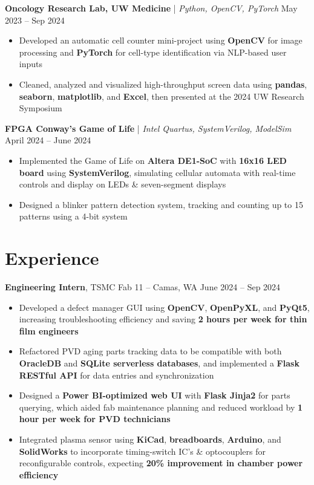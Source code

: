 \documentclass[11pt]{article}       %
\begin{document}
\textbf{Oncology Research Lab, UW Medicine} | \textit{Python, OpenCV, PyTorch} \hfill May 2023 -- Sep 2024 \\
\vspace{-9pt}
\begin{itemize}
  \item Developed an automatic cell counter mini-project using \textbf{OpenCV} for image processing and \textbf{PyTorch} for cell-type identification via NLP-based user inputs
  \item Cleaned, analyzed and visualized high-throughput screen data using \textbf{pandas}, \textbf{seaborn}, \textbf{matplotlib}, and \textbf{Excel}, then presented at the 2024 UW Research Symposium
\end{itemize}

\textbf{FPGA Conway's Game of Life} | \textit{Intel Quartus, SystemVerilog, ModelSim} \hfill April 2024 -- June 2024 \\
\vspace{-9pt}
\begin{itemize}
  \item Implemented the Game of Life on \textbf{Altera DE1-SoC} with \textbf{16x16 LED board} using \textbf{SystemVerilog}, simulating cellular automata with real-time controls and display on LEDs \& seven-segment displays
  \item Designed a blinker pattern detection system, tracking and counting up to 15 patterns using a 4-bit system
\end{itemize}

\vspace{-6.5pt}






\section*{Experience}
\textbf{Engineering Intern}, TSMC Fab 11 -- Camas, WA \hfill June 2024 -- Sep 2024 \\
\vspace{-9pt}
\begin{itemize}
  \item Developed a defect manager GUI using \textbf{OpenCV}, \textbf{OpenPyXL}, and \textbf{PyQt5}, increasing troubleshooting efficiency and saving \textbf{2 hours per week for thin film engineers}
  \item Refactored PVD aging parts tracking data to be compatible with both \textbf{OracleDB} and \textbf{SQLite serverless databases}, and implemented a \textbf{Flask RESTful API} for data entries and synchronization
  \item Designed a \textbf{Power BI-optimized web UI} with \textbf{Flask Jinja2} for parts querying, which aided fab maintenance planning and reduced workload by \textbf{1 hour per week for PVD technicians}
  \item Integrated plasma sensor using \textbf{KiCad}, \textbf{breadboards}, \textbf{Arduino}, and \textbf{SolidWorks} to incorporate timing-switch IC's \& optocouplers for reconfigurable controls, expecting \textbf{20\% improvement in chamber power efficiency}
\end{itemize}
\end{document}
